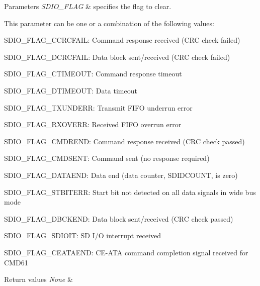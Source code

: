 \begin{DoxyParams}{Parameters}
{\em S\+D\+I\+O\+\_\+\+F\+L\+AG} & specifies the flag to clear.\\
\hline
\end{DoxyParams}
This parameter can be one or a combination of the following values\+: \begin{DoxyItemize}
\item S\+D\+I\+O\+\_\+\+F\+L\+A\+G\+\_\+\+C\+C\+R\+C\+F\+A\+IL\+: Command response received (C\+RC check failed) \item S\+D\+I\+O\+\_\+\+F\+L\+A\+G\+\_\+\+D\+C\+R\+C\+F\+A\+IL\+: Data block sent/received (C\+RC check failed) \item S\+D\+I\+O\+\_\+\+F\+L\+A\+G\+\_\+\+C\+T\+I\+M\+E\+O\+UT\+: Command response timeout \item S\+D\+I\+O\+\_\+\+F\+L\+A\+G\+\_\+\+D\+T\+I\+M\+E\+O\+UT\+: Data timeout \item S\+D\+I\+O\+\_\+\+F\+L\+A\+G\+\_\+\+T\+X\+U\+N\+D\+E\+RR\+: Transmit F\+I\+FO underrun error \item S\+D\+I\+O\+\_\+\+F\+L\+A\+G\+\_\+\+R\+X\+O\+V\+E\+RR\+: Received F\+I\+FO overrun error \item S\+D\+I\+O\+\_\+\+F\+L\+A\+G\+\_\+\+C\+M\+D\+R\+E\+ND\+: Command response received (C\+RC check passed) \item S\+D\+I\+O\+\_\+\+F\+L\+A\+G\+\_\+\+C\+M\+D\+S\+E\+NT\+: Command sent (no response required) \item S\+D\+I\+O\+\_\+\+F\+L\+A\+G\+\_\+\+D\+A\+T\+A\+E\+ND\+: Data end (data counter, S\+D\+I\+D\+C\+O\+U\+NT, is zero) \item S\+D\+I\+O\+\_\+\+F\+L\+A\+G\+\_\+\+S\+T\+B\+I\+T\+E\+RR\+: Start bit not detected on all data signals in wide bus mode \item S\+D\+I\+O\+\_\+\+F\+L\+A\+G\+\_\+\+D\+B\+C\+K\+E\+ND\+: Data block sent/received (C\+RC check passed) \item S\+D\+I\+O\+\_\+\+F\+L\+A\+G\+\_\+\+S\+D\+I\+O\+IT\+: SD I/O interrupt received \item S\+D\+I\+O\+\_\+\+F\+L\+A\+G\+\_\+\+C\+E\+A\+T\+A\+E\+ND\+: C\+E-\/\+A\+TA command completion signal received for C\+M\+D61 
\begin{DoxyRetVals}{Return values}
{\em None} & \\
\hline
\end{DoxyRetVals}
\end{DoxyItemize}
\mbox{\label{group___s_d_i_o___private___functions_ga048e07fd86321cd01b2a22c071c3149b}} 
